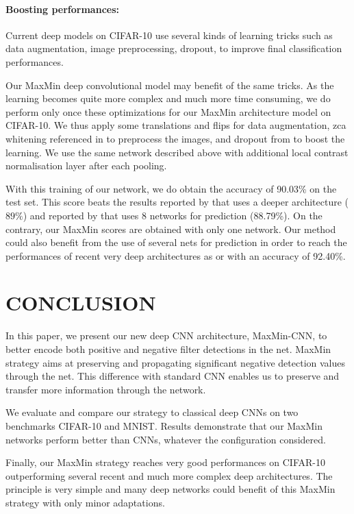 \documentclass{article}
\begin{document}
\paragraph*{Boosting performances:}
Current deep models on CIFAR-10 use several kinds of learning tricks such as data augmentation, image preprocessing, dropout, to improve final classification performances. 

Our MaxMin deep convolutional model may benefit of the same tricks. As the learning becomes quite more complex and much more time consuming, we do perform only once these optimizations for our MaxMin architecture model on CIFAR-10. We thus apply some translations and flips for data augmentation, zca whitening referenced in \cite{zca} to preprocess the images, and dropout from \cite{dropout} to boost the learning. We use the same network described above with additional local contrast normalisation layer after each pooling. %

With this training of our network, we do obtain the accuracy of 90.03\% on the test set.  This score beats the results reported by \cite{alexnet} that uses a deeper architecture ($89\%$) and reported by \cite{multicolumn} that uses 8 networks for prediction (88.79\%). On the contrary, our MaxMin scores are obtained with only one network. Our method could also benefit from the use of several nets for prediction in order to reach the performances of  recent very deep architectures as \cite{cif1} or \cite{cif2} with an accuracy of 92.40\%. 

\section{CONCLUSION}
\label{sec:majhead}
In this paper, we  present our new deep CNN architecture, MaxMin-CNN, to better encode both positive and negative filter detections in the net. MaxMin strategy aims at preserving and propagating significant negative detection values through the net. This difference with standard CNN enables us  to preserve and transfer more information through the network. 

We  evaluate and compare our strategy to classical deep CNNs on two benchmarks CIFAR-10 and MNIST. 
Results demonstrate that our MaxMin networks perform better than CNNs, whatever the configuration considered.

Finally, our MaxMin strategy reaches very good performances on CIFAR-10 outperforming several recent and much more complex deep architectures. The principle is very simple and many deep  networks could benefit of this MaxMin strategy with only minor adaptations.  





\newpage
\newpage



\end{document}
